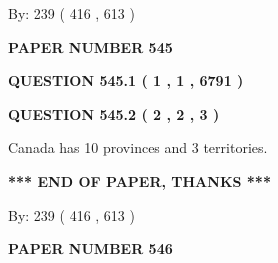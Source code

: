 \documentclass[12pt]{article}
\begin{document}
   
\hspace{1.0in} By: 
 239 ( 416 ,  613 )
   
   
   
   
\newpage 
\setcounter{page}{ 
   545001 } 
   
   
   
   
 {\textbf{ \Large{ PAPER NUMBER  545  }}}
   
   
\vspace{0.2in}
   
   
   
   
   
   
 \vspace{0.2in}
 
 
 
 
   
   
  
\vspace{0.2in}
  
{\textbf{\Large{QUESTION
545.1 
 ( 1 , 1 , 6791 )
}}}
  
  
  
\vspace{0.2in}
  
{\textbf{\Large{QUESTION
545.2 
 ( 2 , 2 , 3 )
}}}
  
  
 
 
\noindent{}
 
 
Canada has 10  provinces and 3 territories.
 
 
 
 
   
   
 \vspace{0.2in}
 
   
   
   
   
\vspace{1.0in} 
{\textbf{\large{ *** END OF PAPER, THANKS *** }}} 
   
   
\hspace{1.0in} By: 
 239 ( 416 ,  613 )
   
   
   
   
\newpage 
\setcounter{page}{ 
   546001 } 
   
   
   
   
 {\textbf{ \Large{ PAPER NUMBER  546  }}}
   
\end{document}
